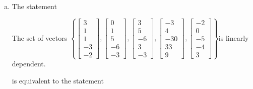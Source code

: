 \begin{exerciseAnswer}
\begin{enumerate}[(a)]
\item The statement 
\begin{center}\begin{minipage}{0.8\textwidth}
 The set of vectors \( \left\{ \left[\begin{array}{c}
3 \\
1 \\
1 \\
-3 \\
-2
\end{array}\right] , \left[\begin{array}{c}
0 \\
1 \\
5 \\
-6 \\
-3
\end{array}\right] , \left[\begin{array}{c}
3 \\
5 \\
-6 \\
3 \\
-3
\end{array}\right] , \left[\begin{array}{c}
-3 \\
4 \\
-30 \\
33 \\
9
\end{array}\right] , \left[\begin{array}{c}
-2 \\
0 \\
-5 \\
-4 \\
3
\end{array}\right] \right\} \)is linearly dependent.
\end{minipage}\end{center}
     is equivalent to the statement 
\begin{center}\begin{minipage}{0.8\textwidth}
 The vector equation \( x_{1} \left[\begin{array}{c}
3 \\
1 \\
1 \\
-3 \\
-2
\end{array}\right] + x_{2} \left[\begin{array}{c}
0 \\
1 \\

\end{array}
\end{minipage}
\end{center}
\end{enumerate}
\end{exerciseAnswer}
